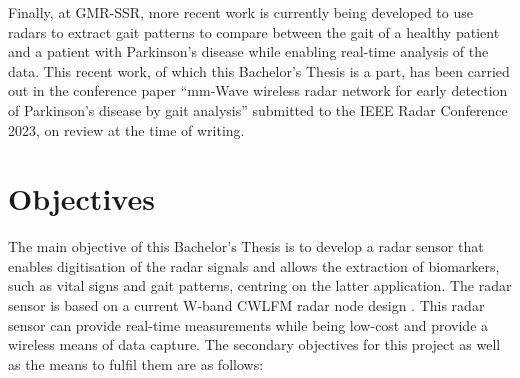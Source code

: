 	Finally, at GMR-SSR, more recent work is currently being developed to use radars to extract gait patterns to compare between the gait of a healthy patient and a patient with Parkinson's disease while enabling real-time analysis of the data. This recent work, of which this Bachelor's Thesis is a part, has been carried out in the conference paper ``mm-Wave wireless radar network for early detection of Parkinson’s disease by gait analysis'' submitted to the IEEE Radar Conference 2023, on review at the time of writing.
	
\section{Objectives}

	The main objective of this Bachelor's Thesis is to develop a radar sensor that enables digitisation of the radar signals and allows the extraction of biomarkers, such as vital signs and gait patterns, centring on the latter application. The radar sensor is based on a current W-band CWLFM radar node design \cite{Sardinero2022,Montesano2019}. This radar sensor can provide real-time measurements while being low-cost and provide a wireless means of data capture. The secondary objectives for this project as well as the means to fulfil them are as follows:

